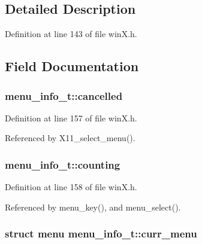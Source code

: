 \subsection{Detailed Description}


Definition at line 143 of file win\+X.\+h.



\subsection{Field Documentation}
\hypertarget{structmenu__info__t_a30d245252e40e13b6352f3d81a31190a}{
\subsubsection[{cancelled}]{ menu\+\_\+info\+\_\+t\+::cancelled}}\label{structmenu__info__t_a30d245252e40e13b6352f3d81a31190a}


Definition at line 157 of file win\+X.\+h.



Referenced by X11\+\_\+select\+\_\+menu().

\hypertarget{structmenu__info__t_a1067a8d44e287117d1f7da3aaa4f62c1}{
\subsubsection[{counting}]{ menu\+\_\+info\+\_\+t\+::counting}}\label{structmenu__info__t_a1067a8d44e287117d1f7da3aaa4f62c1}


Definition at line 158 of file win\+X.\+h.



Referenced by menu\+\_\+key(), and menu\+\_\+select().

\hypertarget{structmenu__info__t_a38a857462707f62f7eaafe8b8bbf9f9c}{
\subsubsection[{curr\+\_\+menu}]{\setlength{\rightskip}{0pt plus 5cm}struct {\bf menu} menu\+\_\+info\+\_\+t\+::curr\+\_\+menu}}\label{structmenu__info__t_a38a857462707f62f7eaafe8b8bbf9f9c}


